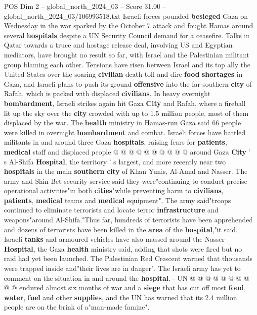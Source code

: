 \begin{textsample}{POS Dim 2 – global\_north\_2024\_03 – Score 31.00 – global\_north\_2024\_03/106993518.txt}  \label{ex:f2_pos_106}
Israeli forces pounded \textbf{besieged} Gaza on Wednesday in the war sparked by the October 7 attack and fought Hamas around several \textbf{hospitals} despite a UN Security Council demand for a ceasefire.
Talks in Qatar towards a truce and hostage release deal, involving US and Egyptian mediators, have brought no result so far, with Israel and the Palestinian militant group blaming each other.
Tensions have risen between Israel and its top ally the United States over the soaring \textbf{civilian} death toll and dire \textbf{food} \textbf{shortages} in Gaza, and Israeli plans to push its ground \textbf{offensive} into the far-southern \textbf{city} of Rafah, which is packed with displaced \textbf{civilians}.
In heavy overnight \textbf{bombardment}, Israeli strikes again hit Gaza \textbf{City} and Rafah, where a fireball lit up the sky over the \textbf{city} crowded with up to 1.5 million people, most of them displaced by the war.
The \textbf{health} ministry in Hamas-run Gaza said 66 people were killed in overnight \textbf{bombardment} and combat.
Israeli forces have battled militants in and around three Gaza \textbf{hospitals}, raising fears for \textbf{patients}, \textbf{medical} staff and displaced people @ @ @ @ @ @ @ @ @ @ around Gaza \textbf{City} ' s Al-Shifa \textbf{Hospital}, the territory ' s largest, and more recently near two \textbf{hospitals} in the main \textbf{southern} \textbf{city} of Khan Yunis, Al-Amal and Nasser.
The army and Shin Bet security service said they were"continuing to conduct precise operational activities"in both \textbf{cities}"while preventing harm to \textbf{civilians}, \textbf{patients}, \textbf{medical} teams and \textbf{medical} equipment".
The army said"troops continued to eliminate terrorists and locate terror \textbf{infrastructure} and weapons"around Al-Shifa."Thus far, hundreds of terrorists have been apprehended and dozens of terrorists have been killed in the \textbf{area} of the \textbf{hospital},"it said.
Israeli \textbf{tanks} and armoured vehicles have also massed around the Nasser \textbf{Hospital}, the Gaza \textbf{health} ministry said, adding that shots were fired but no raid had yet been launched.
The Palestinian Red Crescent warned that thousands were trapped inside and"their lives are in danger".
The Israeli army has yet to comment on the situation in and around the \textbf{hospital}. - UN @ @ @ @ @ @ @ @ @ @ endured almost six months of war and a \textbf{siege} that has cut off most \textbf{food}, \textbf{water}, \textbf{fuel} and other \textbf{supplies}, and the UN has warned that its 2.4 million people are on the brink of a"man-made famine".

\end{textsample}
